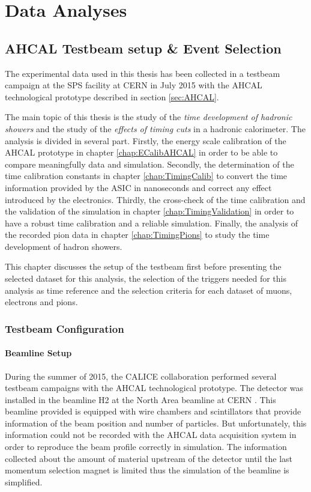 \part{Data Analyses}
\label{chap:TimingAHCAL}

\chapter{AHCAL Testbeam setup \& Event Selection}
\label{chap:EvtSelection}

The experimental data used in this thesis has been collected in a testbeam campaign at the SPS facility at CERN in July 2015 with the AHCAL technological prototype described in section \ref{sec:AHCAL}.

The main topic of this thesis is the study of the \textit{time development of hadronic showers} and the study of the \textit{effects of timing cuts} in a hadronic calorimeter. The analysis is divided in several part. Firstly, the energy scale calibration of the AHCAL prototype in chapter \ref{chap:ECalibAHCAL} in order to be able to compare meaningfully data and simulation. Secondly, the determination of the time calibration constants in chapter \ref{chap:TimingCalib} to convert the time information provided by the ASIC in nanoseconds and correct any effect introduced by the electronics. Thirdly, the cross-check of the time calibration and the validation of the simulation in chapter \ref{chap:TimingValidation} in order to have a robust time calibration and a reliable simulation. Finally, the analysis of the recorded pion data in chapter \ref{chap:TimingPions} to study the time development of hadron showers.

This chapter discusses the setup of the testbeam first before presenting the selected dataset for this analysis, the selection of the triggers needed for this analysis as time reference and the selection criteria for each dataset of muons, electrons and pions.

\section{Testbeam Configuration}

\subsection{Beamline Setup}
\label{sec:beamline}

During the summer of 2015, the CALICE collaboration performed several testbeam campaigns with the AHCAL technological prototype. The detector was installed in the beamline H2 at the North Area beamline at CERN \cite{H2Beamline}. This beamline provided is equipped with wire chambers and scintillators that provide information of the beam position and number of particles. But unfortunately, this information could not be recorded with the AHCAL data acquisition system in order to reproduce the beam profile correctly in simulation. The information collected about the amount of material upstream of the detector until the last momentum selection magnet is limited thus the simulation of the beamline is simplified.

